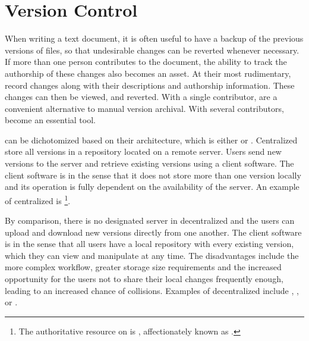 
\section{Version Control}\label{sec:vcs}
When writing a text document, it is often useful to have a backup of the
previous versions of files, so that undesirable changes can be reverted whenever
necessary. If more than one person contributes to the document, the ability to
track the authorship of these changes also becomes an asset. At their most
rudimentary,  record changes along with their descriptions and
authorship information. These changes can then be viewed, and reverted.
With a single contributor,  are a convenient alternative to manual
version archival. With several contributors,  become an essential
tool.

 can be dichotomized based on their architecture, which is either
 or 
. Centralized  store all versions
in a repository located on a remote server. Users send new versions to the
server and retrieve existing versions using a client software. The client
software is  in the sense that it does not store more than one
version locally and its operation is fully dependent on the availability of the
server. An example of centralized  is \footnote{%
	The authoritative resource on  is ,
	affectionately known as .}.

By comparison, there is no designated server in decentralized  and
the users can upload and download new versions directly from one another. The
client software is  in the sense that all users have a local
repository with every existing version, which they can view and manipulate
at any time. The disadvantages include the more complex workflow, greater
storage size requirements and the increased opportunity for the users not to
share their local changes frequently enough, leading to an increased chance of
collisions. Examples of decentralized  include ,
, or .

